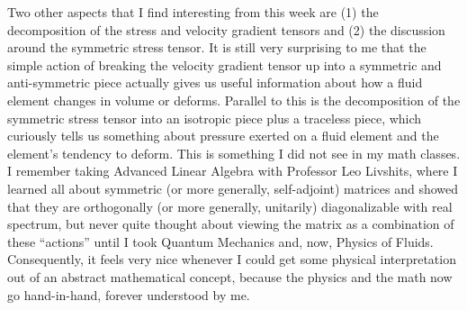 \documentclass[11pt]{article}
\begin{document}
\noindent Two other aspects that I find interesting from this week are (1) the decomposition of the stress and velocity gradient tensors and (2) the discussion around the symmetric stress tensor. It is still very surprising to me that the simple action of breaking the velocity gradient tensor up into a symmetric and anti-symmetric piece actually gives us useful information about how a fluid element changes in volume or deforms. Parallel to this is the decomposition of the symmetric stress tensor into an isotropic piece plus a traceless piece, which curiously tells us something about pressure exerted on a fluid element and the element's tendency to deform. This is something I did not see in my math classes. I remember taking Advanced Linear Algebra with Professor Leo Livshits, where I learned all about symmetric (or more generally, self-adjoint) matrices and showed that they are orthogonally (or more generally, unitarily) diagonalizable with real spectrum, but never quite thought about viewing the matrix as a combination of these ``actions'' until I took Quantum Mechanics and, now, Physics of Fluids. Consequently, it feels very nice whenever I could get some physical interpretation out of an abstract mathematical concept, because the physics and the math now go hand-in-hand, forever understood by me.  


  
\end{document}
